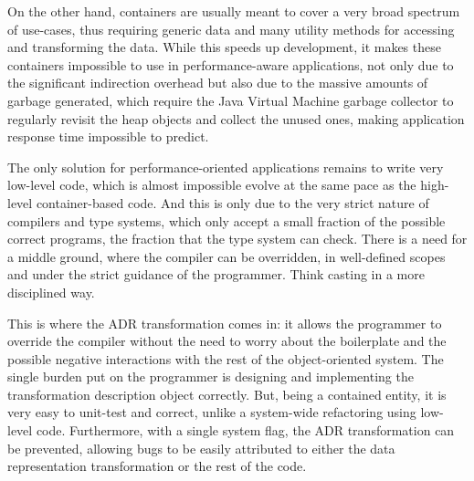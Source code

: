 On the other hand, containers are usually meant to cover a very broad spectrum of use-cases, thus requiring generic data and many utility methods for accessing and transforming the data. While this speeds up development, it makes these containers impossible to use in performance-aware applications, not only due to the significant indirection overhead but also due to the massive amounts of garbage generated, which require the Java Virtual Machine garbage collector to regularly revisit the heap objects and collect the unused ones, making application response time impossible to predict.

The only solution for performance-oriented applications remains to write very low-level code, which is almost impossible evolve at the same pace as the high-level container-based code. And this is only due to the very strict nature of compilers and type systems, which only accept a small fraction of the possible correct programs, the fraction that the type system can check. There is a need for a middle ground, where the compiler can be overridden, in well-defined scopes and under the strict guidance of the programmer. Think casting in a more disciplined way.

This is where the ADR transformation comes in: it allows the programmer to override the compiler without the need to worry about the boilerplate and the possible negative interactions with the rest of the object-oriented system. The single burden put on the programmer is designing and implementing the transformation description object correctly. But, being a contained entity, it is very easy to unit-test and correct, unlike a system-wide refactoring using low-level code. Furthermore, with a single system flag, the ADR transformation can be prevented, allowing bugs to be easily attributed to either the data representation transformation or the rest of the code.
